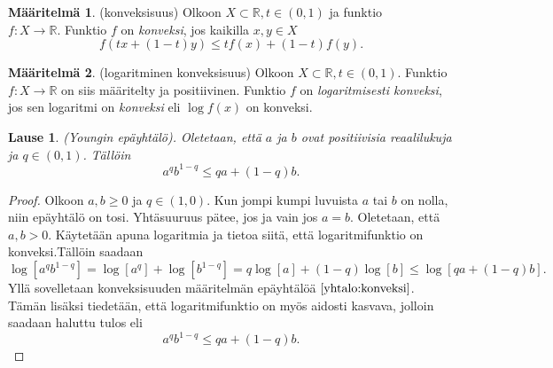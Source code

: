 \documentclass[12pt]{article}
\theoremstyle{definition}
\newtheorem{maar}{Määritelmä}
\theoremstyle{plain}
\newtheorem{lause}{Lause}
\numberwithin{equation}{section}
\begin{document}
\begin{maar}
(konveksisuus) \label{maar: konveksisuus}
Olkoon $X\subset\mathbb{R}, t\in (0, 1)$ ja funktio \\ $f: X \rightarrow \mathbb{R}$. Funktio $f$ on \emph{konveksi}, jos kaikilla $x,y \in X$
\begin{equation}\label{yhtalo:konveksi}
    f(tx+(1-t)y) \le tf(x)+(1-t)f(y).
\end{equation}
\end{maar}


\begin{maar}
(logaritminen konveksisuus) \label{maar: logkonveksisuus}
Olkoon $X\subset\mathbb{R}, t \in (0, 1)$. Funktio $f: X \rightarrow \mathbb{R}$ on siis määritelty ja positiivinen. Funktio $f$ on \emph{logaritmisesti konveksi}, jos sen logaritmi on \emph{konveksi} eli $\log f(x)$ on konveksi.
\end{maar}

\begin{lause} \label{lause: young}
(Youngin epäyhtälö). Oletetaan, että $a$ ja $b$ ovat positiivisia reaalilukuja ja $q \in (0,1)$. Tällöin
\begin{equation}\label{yhtalo:youngi}
    a^{q}b^{1-q} \le qa+(1-q)b.
\end{equation}
\end{lause}
\begin{proof}
Olkoon $a,b \ge 0$ ja $q \in (1,0)$. Kun jompi kumpi luvuista $a$ tai $b$ on nolla, niin epäyhtälö on tosi. Yhtäsuuruus pätee, jos ja vain jos $a=b$. Oletetaan, että $a,b > 0$. Käytetään apuna logaritmia ja tietoa siitä, että logaritmifunktio on konveksi.Tällöin saadaan
\begin{equation*}
    \log[a^{q}b^{1-q}] = \log[a^q] + \log[b^{1-q}] = q \log [a]+(1-q)\log [b] \le \log[qa+(1-q)b].
\end{equation*}
Yllä sovelletaan konveksisuuden määritelmän epäyhtälöä $\eqref{yhtalo:konveksi}$. Tämän lisäksi tiedetään, että logaritmifunktio on myös aidosti kasvava, jolloin saadaan haluttu tulos eli
\begin{equation*}
    a^{q}b^{1-q}\le qa+(1-q)b.
\end{equation*}
\end{proof}
\end{document}
